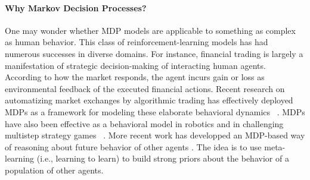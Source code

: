 \documentclass[10pt,letterpaper]{article}
\begin{document}
\paragraph*{Why Markov Decision Processes?} One may wonder whether MDP models
are applicable to something as complex as human behavior. This class of
reinforcement-learning models has had numerous successes in diverse domains. For instance, financial trading is largely a manifestation of strategic decision-making of interacting human agents. According to how the market responds, the agent incurs gain or loss as environmental feedback of the executed financial actions. Recent research on automatizing market exchanges by algorithmic trading has effectively deployed MDPs as a framework for modeling these elaborate behavioral dynamics  ~\citep{brazdil2017,yang15,yang14,yang12,dempster2006,hult2010, abergel2017}.
%
MDPs have also been effective as a behavioral model in robotics
\citep{ng2004,abbeel2004} and in challenging multistep strategy games
~\citep{mnih2015,silver2016mastering,pritzel2017neural}. 
More recent work has
developped an MDP-based way of reasoning about future behavior
of other agents \citep{robinowitz2018}.
The idea is to use meta-learning (i.e., learning to learn) to build strong priors
about the behavior of a population of other agents.




\end{document}
